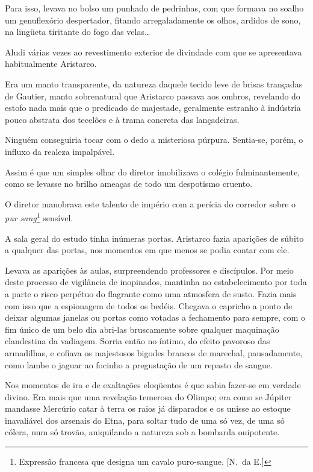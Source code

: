 Para isso, levava no bolso um punhado de pedrinhas, com que
formava no soalho um genuflexório despertador, fitando arregaladamente
os olhos, ardidos de sono, na lingüeta tiritante do fogo das velas\ldots

Aludi várias vezes ao revestimento exterior de divindade com que se
apresentava habitualmente Aristarco. 

Era um manto transparente, da
natureza daquele tecido leve de brisas trançadas de Gautier, manto
sobrenatural que Aristarco passava aos ombros, revelando do estofo nada
mais que o predicado de majestade, geralmente estranho à indústria
pouco abstrata dos tecelões e à trama concreta das lançadeiras. 

Ninguém conseguiria tocar com o dedo a misteriosa púrpura. Sentia{}-se, porém,
o influxo da realeza impalpável.

Assim é que um simples olhar do diretor imobilizava o colégio
fulminantemente, como se levasse no brilho ameaças de todo um
despotismo cruento. 

O diretor manobrava este talento de império com a
perícia do corredor sobre o \textit{pur sang}\footnote{ Expressão francesa que designa 
um cavalo puro-sangue. [N.~da E.]} sensível. 

A sala geral do estudo
tinha inúmeras portas. Aristarco fazia aparições de súbito a qualquer
das portas, nos momentos em que menos se podia contar com ele. 

Levava as aparições às aulas, surpreendendo professores e discípulos. Por meio
deste processo de vigilância de inopinados, mantinha no estabelecimento
por toda a parte o risco perpétuo do flagrante como uma atmosfera de
susto. Fazia mais com isso que a espionagem de todos os bedéis. Chegava
o capricho a ponto de deixar algumas janelas ou portas como votadas a
fechamento para sempre, com o fim único de um belo dia abri{}-las
bruscamente sobre qualquer maquinação clandestina da vadiagem. Sorria
então no íntimo, do efeito pavoroso das armadilhas, e cofiava os
majestosos bigodes brancos de marechal, pausadamente, como lambe o
jaguar ao focinho a pregustação de um repasto de sangue. 

Nos momentos de ira e de exaltações eloqüentes é que sabia fazer{}-se em verdade
divino. Era mais que uma revelação temerosa do Olimpo; era como se
Júpiter mandasse Mercúrio catar à terra os raios já disparados e os
unisse ao estoque inavaliável dos arsenais do Etna, para soltar tudo de
uma só vez, de uma só cólera, num só trovão, aniquilando a natureza sob
a bombarda onipotente. 

